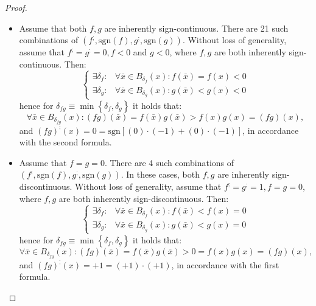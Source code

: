 \documentclass[11pt]{book}
\begin{document}
\begin{proof}
\begin{enumerate}
\begin{itemize}
\item Assume that both $f,g$ are inherently sign-continuous. There are 21 such combinations of $\left(f^{;},\text{sgn}\left(f\right),g^{;},\text{sgn}\left(g\right)\right)$. Without loss of generality, assume that $f^{;}=g^{;}=0,f< 0$ and $g<0$, where $f,g$ are both inherently sign-continuous. Then: $$\begin{cases} \exists\delta_{f}: & \forall\bar{x}\in B_{\delta_{f}}\left(x\right):f\left(\bar{x}\right)=f\left(x\right)< 0\\ \exists\delta_{g}: & \forall\bar{x}\in B_{\delta_{g}}\left(x\right):g\left(\bar{x}\right)< g\left(x\right)<0 \end{cases}$$ hence for $\delta_{fg}\equiv\min\left\{ \delta_{f},\delta_{g}\right\}$ it holds that: $$\forall\bar{x}\in B_{\delta_{fg}}\left(x\right):\left(fg\right)\left(\bar{x}\right)=f\left(\bar{x}\right)g\left(\bar{x}\right) > f\left(x\right)g\left(x\right)=\left(fg\right)\left(x\right),$$ and $\left(fg\right)^{;}\left(x\right)=0=\text{sgn}\left[\left(0\right)\cdot\left(-1\right)+\left(0\right)\cdot\left(-1\right)\right]$, in accordance with the second formula.

\item Assume that $f=g=0$. There are 4 such combinations of $\left(f^{;},\text{sgn}\left(f\right),g^{;},\text{sgn}\left(g\right)\right)$. In these cases, both $f,g$ are inherently sign-discontinuous. Without loss of generality, assume that $f^{;}=g^{;}=1,f=g=0$, where $f,g$ are both inherently sign-discontinuous. Then: $$\begin{cases} \exists\delta_{f}: & \forall\bar{x}\in B_{\delta_{f}}\left(x\right):f\left(\bar{x}\right)< f\left(x\right)=0\\ \exists\delta_{g}: & \forall\bar{x}\in B_{\delta_{g}}\left(x\right):g\left(\bar{x}\right)< g\left(x\right)=0 \end{cases}$$ hence for $\delta_{fg}\equiv\min\left\{ \delta_{f},\delta_{g}\right\}$ it holds that: $$\forall\bar{x}\in B_{\delta_{fg}}\left(x\right):\left(fg\right)\left(\bar{x}\right)=f\left(\bar{x}\right)g\left(\bar{x}\right)> 0=f\left(x\right)g\left(x\right)=\left(fg\right)\left(x\right),$$ and $\left(fg\right)^{;}\left(x\right)=+1=\left(+1\right)\cdot\left(+1\right)$, in accordance with the first formula.
\end{itemize}


\end{enumerate}
\end{proof}
\end{document}
